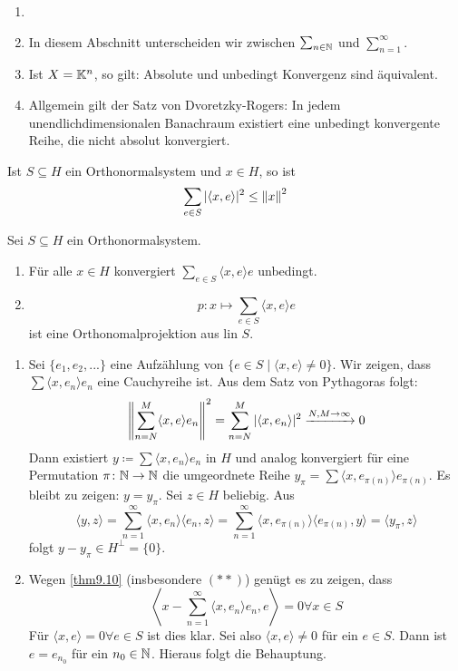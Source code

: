 \begin{bemerkung*}
	\begin{enumerate}
		\item[] 
		\item In diesem Abschnitt unterscheiden wir zwischen $ \sum_{n\in\mathbb{N}} $ und $ \sum_{n=1}^\infty $.
		\item Ist $ X=\mathbb{K}^n $, so gilt: Absolute und unbedingt Konvergenz sind \"aquivalent.
		\item Allgemein gilt der Satz von Dvoretzky-Rogers: In jedem unendlichdimensionalen Banachraum existiert eine unbedingt konvergente Reihe, die nicht absolut konvergiert.
	\end{enumerate}
\end{bemerkung*}
\begin{korollar}
Ist $ S\subseteq H $ ein Orthonormalsystem und $ x\in H $, so ist
\[ \sum_{e\in S} |\langle x,e\rangle|^2\leq\left\|x\right\|^2 \]	
\end{korollar}
\begin{satz}
	Sei $ S\subseteq H $ ein Orthonormalsystem.
	\begin{enumerate}
		\item F\"ur alle $ x\in H $ konvergiert $ \sum_{e\in S}\langle x,e\rangle e$ unbedingt.
		\item 
		\[ p\colon x\mapsto\sum_{e\in S}\langle x,e\rangle e \] ist eine Orthonomalprojektion aus $ \text{lin }S $.
	\end{enumerate}
\end{satz}
\begin{beweis}
	\begin{enumerate}
		\item Sei $ \lbrace e_1,e_2,...\rbrace $ eine Aufz\"ahlung von $ \lbrace e\in S\mid \langle x,e\rangle\neq 0\rbrace $. Wir zeigen, dass $ \sum\langle x,e_n\rangle e_n $ eine Cauchyreihe ist. Aus dem Satz von Pythagoras folgt:
		\[ \left\|\sum_{n=N}^{M}\langle x,e\rangle e_n\right\|^2=\sum_{n=N}^M|\langle x,e_n\rangle|^2\xrightarrow{N,M\to\infty}0 \]
		Dann existiert $ y\coloneqq\sum\langle x,e_n\rangle e_n $ in $ H $ und analog konvergiert f\"ur eine Permutation $ \pi\colon\mathbb{N}\rightarrow\mathbb{N} $ die umgeordnete Reihe $ y_\pi=\sum \langle x,e_{\pi(n)}\rangle e_{\pi(n)} $. Es bleibt zu zeigen: $ y=y_\pi $. Sei $ z\in H $ beliebig. Aus
		\[ \langle y,z\rangle=\sum_{n=1}^\infty \langle x,e_n\rangle\langle e_n,z\rangle=\sum_{n=1}^\infty\langle x,e_{\pi(n)}\rangle\langle e_{\pi(n)}, y\rangle=\langle y_\pi, z\rangle \]
		folgt $ y-y_\pi\in H^\perp=\lbrace 0\rbrace $. 
		\item Wegen \ref{thm9.10} (insbesondere $ (\ast\ast) $) gen\"ugt es zu zeigen, dass
		\[ \left\langle x-\sum_{n=1}^\infty\langle x,e_n\rangle e_n,e\right\rangle=0\forall x\in S \]
		F\"ur $ \langle x,e\rangle=0\forall e\in S $ ist dies klar. Sei also $ \langle x,e\rangle\neq 0 $ f\"ur ein $ e\in S $. Dann ist $ e=e_{n_0} $ f\"ur ein $ n_0\in\mathbb{N} $. Hieraus folgt die Behauptung.
	\end{enumerate}
\end{beweis}
